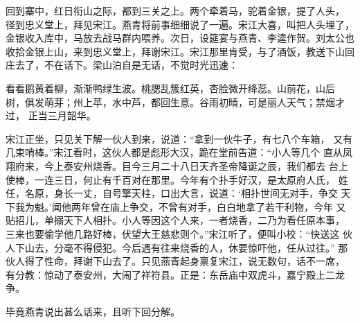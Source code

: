 回到寨中，红日衔山之际，都到三关之上。两个牵着马，驼着金银，提了人头，
径到忠义堂上，拜见宋江。燕青将前事细细说了一遍。宋江大喜，叫把人头埋了，
金银收入库中，马放去战马群内喂养。次日，设筵宴与燕青、李逵作贺。刘太公也
收拾金银上山，来到忠义堂上，拜谢宋江。宋江那里肯受，与了酒饭，教送下山回
庄去了，不在话下。梁山泊自是无话，不觉时光迅速：

看看鹅黄着柳，渐渐鸭绿生波。桃腮乱簇红英，杏脸微开绛蕊。山前花，山后
树，俱发萌芽；州上苹，水中芦，都回生意。谷雨初晴，可是丽人天气；禁烟才过，
正当三月韶华。

宋江正坐，只见关下解一伙人到来，说道：“拿到一伙牛子，有七八个车箱，
又有几束哨棒。”宋江看时，这伙人都是彪形大汉，跪在堂前告道：“小人等几个
直从凤翔府来，今上泰安州烧香。目今三月二十八日天齐圣帝降诞之辰，我们都去
台上使棒，一连三日，何止有千百对在那里。今年有个扑手好汉，是太原府人氏，
姓任，名原，身长一丈，自号擎天柱，口出大言，说道：‘相扑世间无对手，争交
天下我为魁。’闻他两年曾在庙上争交，不曾有对手，白白地拿了若干利物，今年
又贴招儿，单搦天下人相扑。小人等因这个人来，一者烧香，二乃为看任原本事，
三来也要偷学他几路好棒，伏望大王慈悲则个。”宋江听了，便叫小校：“快送这
伙人下山去，分毫不得侵犯。今后遇有往来烧香的人，休要惊吓他，任从过往。”
那伙人得了性命，拜谢下山去了。只见燕青起身禀复宋江，说无数句，话不一席，
有分教：惊动了泰安州，大闹了祥符县。正是：东岳庙中双虎斗，嘉宁殿上二龙争。

毕竟燕青说出甚么话来，且听下回分解。